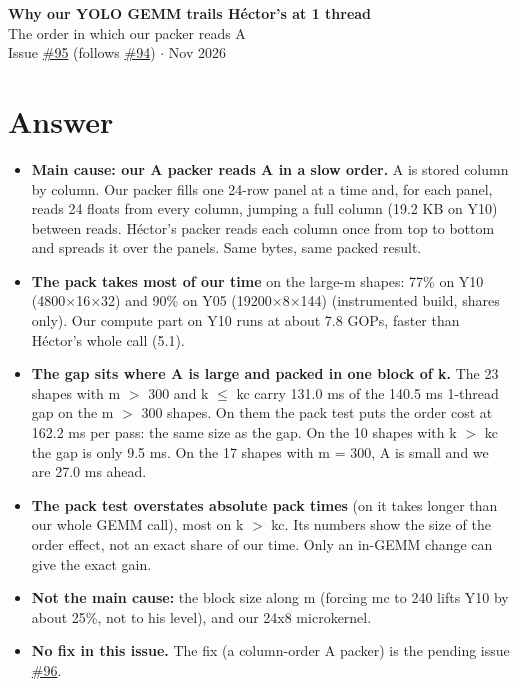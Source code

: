 \documentclass[10pt,a4paper]{article}
\newcommand{\iss}[1]{\href{https://github.com/JieGH/RVV_code_gen_via_MLIR_xDSL/issues/#1}{\##1}}
\newcommand{\D}{data}
\begin{document}
\sloppy
\begin{center}
{\Large\bfseries Why our YOLO GEMM trails H\'ector's at 1 thread}\\[4pt]
The order in which our packer reads A\\[2pt]
Issue \iss{95} (follows \iss{94}) \quad$\cdot$ Nov 2026
\end{center}

\section*{Answer}
\begin{itemize}\setlength\itemsep{2pt}
\item \textbf{Main cause: our A packer reads A in a slow order.} A is stored column by column. Our packer fills one 24-row panel at a time and, for each panel, reads 24 floats from every column, jumping a full column (19.2 KB on Y10) between reads. H\'ector's packer reads each column once from top to bottom and spreads it over the panels. Same bytes, same packed result.
\item \textbf{The pack takes most of our time} on the large-m shapes: 77\% on Y10 (4800$\times$16$\times$32) and 90\% on Y05 (19200$\times$8$\times$144) (instrumented build, shares only). Our compute part on Y10 runs at about 7.8 GOPs, faster than H\'ector's whole call (5.1).
\item \textbf{The gap sits where A is large and packed in one block of k.} The 23 shapes with m $>$ 300 and k $\le$ kc carry 131.0 ms of the 140.5 ms 1-thread gap on the m $>$ 300 shapes. On them the pack test puts the order cost at 162.2 ms per pass: the same size as the gap. On the 10 shapes with k $>$ kc the gap is only 9.5 ms. On the 17 shapes with m = 300, A is small and we are 27.0 ms ahead.
\item \textbf{The pack test overstates absolute pack times} (on  it takes longer than our whole GEMM call), most on k $>$ kc. Its numbers show the size of the order effect, not an exact share of our time. Only an in-GEMM change can give the exact gain.
\item \textbf{Not the main cause:} the block size along m (forcing mc to 240 lifts Y10 by about 25\%, not to his level), and our 24x8 microkernel.
\item \textbf{No fix in this issue.} The fix (a column-order A packer) is the pending issue \iss{96}.
\end{itemize}
\end{document}
